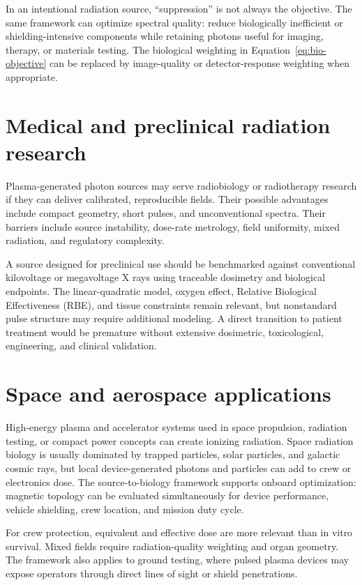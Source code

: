 In an intentional radiation source, ``suppression'' is not always the objective. The same framework can optimize spectral quality: reduce biologically inefficient or shielding-intensive components while retaining photons useful for imaging, therapy, or materials testing. The biological weighting in Equation~\eqref{eq:bio-objective} can be replaced by image-quality or detector-response weighting when appropriate.

\section{Medical and preclinical radiation research}

Plasma-generated photon sources may serve radiobiology or radiotherapy research if they can deliver calibrated, reproducible fields. Their possible advantages include compact geometry, short pulses, and unconventional spectra. Their barriers include source instability, dose-rate metrology, field uniformity, mixed radiation, and regulatory complexity.

A source designed for preclinical use should be benchmarked against conventional kilovoltage or megavoltage X rays using traceable dosimetry and biological endpoints. The linear-quadratic model, oxygen effect, Relative Biological Effectiveness (RBE), and tissue constraints remain relevant, but nonstandard pulse structure may require additional modeling. A direct transition to patient treatment would be premature without extensive dosimetric, toxicological, engineering, and clinical validation.

\section{Space and aerospace applications}

High-energy plasma and accelerator systems used in space propulsion, radiation testing, or compact power concepts can create ionizing radiation. Space radiation biology is usually dominated by trapped particles, solar particles, and galactic cosmic rays, but local device-generated photons and particles can add to crew or electronics dose. The source-to-biology framework supports onboard optimization: magnetic topology can be evaluated simultaneously for device performance, vehicle shielding, crew location, and mission duty cycle.

For crew protection, equivalent and effective dose are more relevant than in vitro survival. Mixed fields require radiation-quality weighting and organ geometry. The framework also applies to ground testing, where pulsed plasma devices may expose operators through direct lines of sight or shield penetrations.

